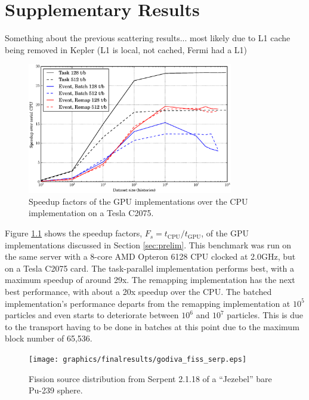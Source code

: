 \chapter{Supplementary Results}
\label{app:A}

Something about the previous scattering results...  most likely due to L1 cache being removed in Kepler (L1 is local, not cached, Fermi had a L1)

\begin{figure}[h!] 
  \centering
    \includegraphics[width=0.8\textwidth]{graphics/prelim_speedup_old.eps}
     \caption{Speedup factors of the GPU implementations over the CPU implementation on a Tesla C2075. \label{prelim_speedup_old} }
\end{figure}

Figure \ref{prelim_speedup_old} shows the speedup factors, $F_s=t_\mathrm{CPU}/t_\mathrm{GPU}$, of the GPU implementations discussed in Section \ref{sec:prelim}.  This benchmark was run on the same server with a 8-core AMD Opteron 6128 CPU clocked at 2.0GHz, but on a Tesla C2075 card.  The task-parallel implementation performs best, with a maximum speedup of around 29x.  The remapping implementation has the next best performance, with about a 20x speedup over the CPU. The batched implementation's performance departs from the remapping implementation at $10^5$ particles and even starts to deteriorate between $10^6$ and $10^7$ particles.  This is due to the transport having to be done in batches at this point due to the maximum block number of 65,536.

\begin{figure}[h!] 
  \centering
    \texttt{[image: graphics/finalresults/godiva\_fiss\_serp.eps]}
     \caption{Fission source distribution from Serpent 2.1.18 of a ``Jezebel'' bare Pu-239 sphere. \label{serp_godiva_mesh} }
\end{figure}

